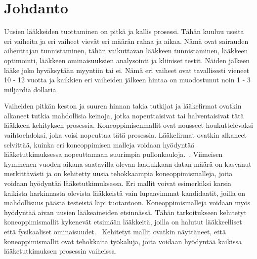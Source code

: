\documentclass[finnish,twoside,censored,tkt,sw-line]{HYthesisML}
\begin{document}
\newpage
\mytableofcontents
\mainmatter


%
%
%
% 


\chapter{Johdanto}

Uusien lääkkeiden tuottaminen on pitkä ja kallis prosessi.
Tähän kuuluu useita eri vaiheita ja eri vaiheet vievät eri määrän rahaa ja aikaa.
Nämä ovat sairauden aiheuttajan tunnistaminen, tähän vaikuttavan lääkkeen tunnistaminen, lääkkeen optimointi, lääkkeen ominaisuuksien analysointi ja kliiniset testit.
Näiden jälkeen lääke joko hyväksytään myyntiin tai ei.
Nämä eri vaiheet ovat tavallisesti vieneet 10 - 12 vuotta ja kaikkien eri vaiheiden jälkeen hintaa on muodostunut noin 1 - 3 miljardia dollaria.~\cite{EkinsSean2019Emlf}

Vaiheiden pitkän keston ja suuren hinnan takia tutkijat ja lääkefirmat ovatkin alkaneet tutkia mahdollisia keinoja, jotka nopeuttaisivat tai halventaisivat tätä lääkkeen kehityksen prosessia.
Koneoppimisenmallit ovat nousseet houkuttelevaksi vaihtoehdoksi, joka voisi nopeuttaa tätä prosessia.
Lääkefirmat ovatkin alkaneet selvittää, kuinka eri koneoppimisen malleja voidaan hyödyntää lääketutkimuksessa nopeuttamaan suurimpia pullonkauloja.~\cite{EkinsSean2019Emlf}.
Viimeisen kymmenen vuoden aikana saatavilla olevan laadukkaan datan määrä on kasvanut merkittävästi ja on kehitetty uusia tehokkaampia koneoppimismalleja, joita voidaan hyödyntää lääketutkimuksessa.
Eri mallit voivat esimerkiksi karsia kaikista harkinnasta olevista lääkkeistä vain lupaavimmat kandidaatit, joilla on mahdollisuus päästä testeistä läpi tuotantoon.
Koneoppimismalleja voidaan myös hyödyntää aivan uusien lääkeaineiden etsinnässä.
Tähän tarkoitukseen kehitetyt koneoppimismallit kykenevät etsimään lääkkeitä, joilla on halutut lääkkeelliset että fysikaaliset ominaisuudet.~\cite{VamathevanJessica2019Aoml}
Kehitetyt mallit ovatkin näyttäneet, että koneoppimismallit ovat tehokkaita työkaluja, joita voidaan hyödyntää kaikissa lääketutkimuksen prosessin vaiheissa.
\end{document}
